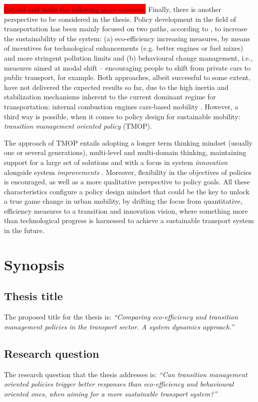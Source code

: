 \documentclass[a4paper,fontsize=10pt,bibliography=totoc]{scrartcl}
\begin{document}
\begin{multicols}{2}
\colorbox{red}{Extend and make the following more concrete:}
Finally, there is another perspective to be considered in the thesis. Policy development in the field of transportation has been mainly focused on two paths, according to \textcite{koehler2009_transitionsmodelsustainable}, to increase the sustainability of the system: (a) eco-efficiency increasing measures, by means of incentives for technological enhancements (e.g. better engines or fuel mixes) and more stringent pollution limits and (b) behavioural change management, i.e., measures aimed at modal shift -- encouraging people to shift from private cars to public transport, for example. Both approaches, albeit successful to some extent, have not delivered the expected results so far, due to the high inertia and stabilization mechanisms inherent to the current dominant regime for transportation: internal combustion engines cars-based mobility \parencite{geels2012_AutomobilityTransitionSocio}. However, a third way is possible, when it comes to policy design for sustainable mobility: \textit{transition management oriented policy} (TMOP).

The approach of TMOP entails adopting a longer term thinking mindset (usually one or several generations), multi-level and multi-domain thinking, maintaining support for a large set of solutions and with a focus in system \textit{innovation} alongside system \textit{improvements} \parencite{rotmans2001_Moreevolutionthan}. Moreover, flexibility in the objectives of policies is encouraged, as well as a more qualitative perspective to policy goals. All these characteristics configure a policy design mindset that could be the key to unlock a true game change in urban mobility, by drifting the focus from quantitative, efficiency measures to a transition and innovation vision, where something more than technological progress is harnessed to achieve a sustainable transport system in the future.

\section{Synopsis}
\label{s:synopsis}
\subsection*{Thesis title}
The proposed title for the thesis is: \textit{``Comparing eco-efficiency and transition management policies in the transport sector. A system dynamics approach.''}

\subsection*{Research question}
The research question that the thesis addresses is: \textit{``Can transition management oriented policies trigger better responses than eco-efficiency and behavioural oriented ones, when aiming for a more sustainable transport system?''}


\end{multicols}
\end{document}
